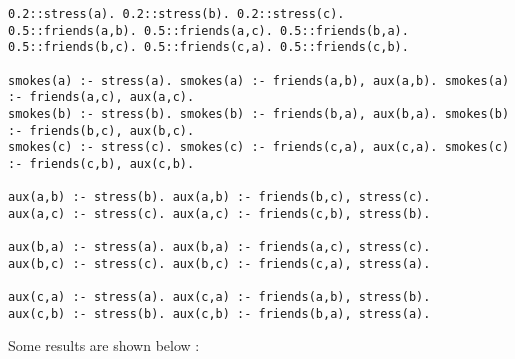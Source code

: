 \begin{code}
\begin{verbatim}
0.2::stress(a). 0.2::stress(b). 0.2::stress(c).
0.5::friends(a,b). 0.5::friends(a,c). 0.5::friends(b,a). 
0.5::friends(b,c). 0.5::friends(c,a). 0.5::friends(c,b).

smokes(a) :- stress(a). smokes(a) :- friends(a,b), aux(a,b). smokes(a) :- friends(a,c), aux(a,c).
smokes(b) :- stress(b). smokes(b) :- friends(b,a), aux(b,a). smokes(b) :- friends(b,c), aux(b,c).
smokes(c) :- stress(c). smokes(c) :- friends(c,a), aux(c,a). smokes(c) :- friends(c,b), aux(c,b).

aux(a,b) :- stress(b). aux(a,b) :- friends(b,c), stress(c).
aux(a,c) :- stress(c). aux(a,c) :- friends(c,b), stress(b).

aux(b,a) :- stress(a). aux(b,a) :- friends(a,c), stress(c).
aux(b,c) :- stress(c). aux(b,c) :- friends(c,a), stress(a).

aux(c,a) :- stress(a). aux(c,a) :- friends(a,b), stress(b).
aux(c,b) :- stress(b). aux(c,b) :- friends(b,a), stress(a).
\end{verbatim}
\label{code:base}
\vspace{0.5cm}
\end{code}

\par\noindent Some results are shown below :

